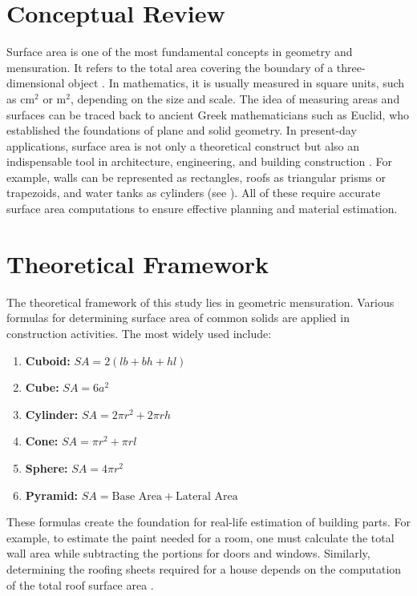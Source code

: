 \documentclass[12pt,a4paper,openany,titlepage,reqno, final]{report}
\theoremstyle{definition}
\begin{document}
	\section{Conceptual Review} Surface area is one of the most fundamental concepts in geometry and mensuration. It refers to the total area covering the boundary of a three-dimensional object \cite{nwachukwu2021}. In mathematics, it is usually measured in square units, such as cm$^2$ or m$^2$, depending on the size and scale. The idea of measuring areas and surfaces can be traced back to ancient Greek mathematicians such as Euclid, who established the foundations of plane and solid geometry. In present-day applications, surface area is not only a theoretical construct but also an indispensable tool in architecture, engineering, and building construction \cite{francis2017}. For example, walls can be represented as rectangles, roofs as triangular prisms or trapezoids, and water tanks as cylinders (see \cite{yusuf2019,smith2014,ayeni2014,musa2018}). All of these require accurate surface area computations to ensure effective planning and material estimation.
	
	\section{Theoretical Framework} The theoretical framework of this study lies in geometric mensuration. Various formulas for determining surface area of common solids are applied in construction activities. The most widely used include:
	
	\begin{enumerate} \item \textbf{Cuboid:} $SA = 2(lb + bh + hl)$ \item \textbf{Cube:} $SA = 6a^2$ \item \textbf{Cylinder:} $SA = 2\pi r^2 + 2\pi rh$ \item \textbf{Cone:} $SA = \pi r^2 + \pi rl$ \item \textbf{Sphere:} $SA = 4\pi r^2$ \item \textbf{Pyramid:} $SA = \text{Base Area} + \text{Lateral Area}$ \end{enumerate}
	
	These formulas create the foundation for real-life estimation of building parts. For example, to estimate the paint needed for a room, one must calculate the total wall area while subtracting the portions for doors and windows. Similarly, determining the roofing sheets required for a house depends on the computation of the total roof surface area \cite{johnson2013,ugwu2017}.
	
\end{document}
